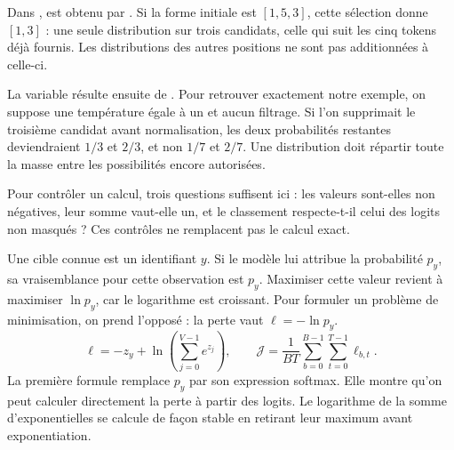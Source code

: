 Dans ,  est obtenu
par . Si la forme initiale est
\([1,5,3]\), cette sélection donne \([1,3]\) : une seule
distribution sur trois candidats, celle qui suit les cinq tokens
déjà fournis. Les distributions des autres positions ne sont
pas additionnées à celle-ci.

La variable  résulte ensuite de .
Pour retrouver exactement notre exemple, on suppose une température
égale à un et aucun filtrage. Si l'on supprimait le troisième
candidat avant normalisation, les deux probabilités restantes
deviendraient \(1/3\) et \(2/3\), et non \(1/7\) et \(2/7\).
Une distribution doit répartir toute la masse entre les possibilités
encore autorisées.

Pour contrôler un calcul, trois questions suffisent ici :
les valeurs sont-elles non négatives, leur somme vaut-elle un,
et le classement respecte-t-il celui des logits non masqués ?
Ces contrôles ne remplacent pas le calcul exact.



Une cible connue est un identifiant \(y\). Si le modèle lui
attribue la probabilité \(p_y\), sa vraisemblance pour cette
observation est \(p_y\). Maximiser cette valeur revient à
maximiser \(\ln p_y\), car le logarithme est croissant.
Pour formuler un problème de minimisation, on prend l'opposé :
la perte vaut \(\ell=-\ln p_y\).
\[
 \ell=-z_y+\ln\!\left(\sum_{j=0}^{V-1}e^{z_j}\right),
 \qquad
 \mathcal{J}=\frac{1}{BT}\sum_{b=0}^{B-1}\sum_{t=0}^{T-1}
 \ell_{b,t}.
\]
La première formule remplace \(p_y\) par son expression softmax.
Elle montre qu'on peut calculer directement la perte à partir
des logits. Le logarithme de la somme d'exponentielles se calcule
de façon stable en retirant leur maximum avant exponentiation.

